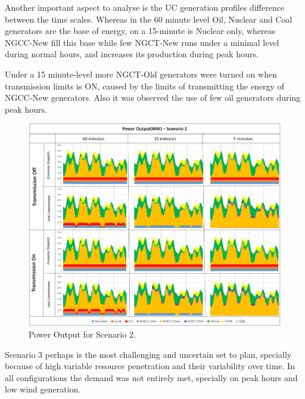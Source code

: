 \documentclass[12pt,LUDisStyle,twosided]{book}
\begin{document}

Another important aspect to analyse is the UC generation profiles difference between the time scales. Whereas in the 60 minute level Oil, Nuclear and Coal generators are the base of energy, on a 15-minute is  Nuclear only, whereas NGCC-New fill this base while few NGCT-New runs under a minimal level during normal hours, and increases its production during peak hours. 

Under a 15 minute-level more NGCT-Old generators were turned on when transmission limits is ON, caused by the limits of transmitting the energy of NGCC-New generators. Also it was observed the use of few oil generators during peak hours.

\begin{figure} 
  \centering
  
	  \includegraphics[width=\textwidth,height=\textheight,keepaspectratio]{PowerOutputScenario2.png}
  
  \caption{Power Output for Scenario 2.}
  \label{fig:powerOutputScenario2}
\end{figure}

Scenario 3 perhaps is the most challenging and uncertain set to plan, specially because of high variable resource penetration and their variability over time. In all configurations the demand was not entirely met, specially on peak hours and low wind generation. 
\end{document}
